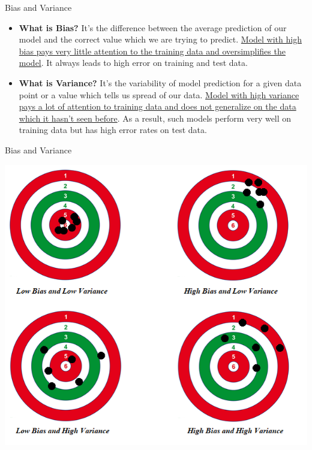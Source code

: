 \documentclass[11pt]{beamer}
\begin{document}
\begin{frame}{Bias and Variance}

\begin{itemize}

\item \textbf{What is Bias?} It's the difference between the average prediction of our model and the correct value which we are trying to predict. \ul{Model with high bias pays very little attention to the training data and oversimplifies the model}. It always leads to high error on training and test data.

\item \textbf{What is Variance?} It's the variability of model prediction for a given data point or a value which tells us spread of our data. \ul{Model with high variance pays a lot of attention to training data and does not generalize on the data which it hasn't seen before}. As a result, such models perform very well on training data but has high error rates on test data.

\end{itemize}

\end{frame}
\begin{frame}{Bias and Variance}
\begin{center}
\includegraphics[scale=.45]{../05-pictures/lesson-2-2_pic_14.png}  
\end{center}
\end{frame}
\end{document}
